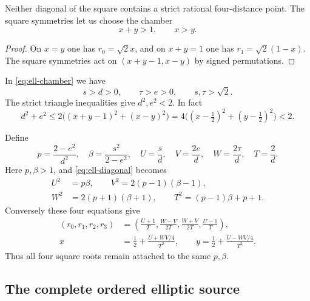 \begin{lemma}\label{lem:ell-diagonal-exclusion}
Neither diagonal of the square contains a strict rational four-distance
point.  The square symmetries let us choose the chamber
\begin{equation}\label{eq:ell-chamber}
 x+y>1,\qquad x>y.
\end{equation}
\end{lemma}
\begin{proof}
On $x=y$
one has $r_0=\sqrt2x$, and on $x+y=1$ one has
$r_1=\sqrt2(1-x)$.  The square symmetries act on
$(x+y-1,x-y)$ by signed permutations.
\end{proof}
In \eqref{eq:ell-chamber} we have
\[
 s>d>0,\qquad \tau>e>0,\qquad s,\tau>\sqrt2.
\]
The strict triangle inequalities give $d^2,e^2<2$.  In fact
\begin{equation}\label{eq:ell-J-negative}
 d^2+e^2\leq
 2\bigl((x+y-1)^2+(x-y)^2\bigr)
 =4\bigl((x-\tfrac12)^2+(y-\tfrac12)^2\bigr)<2.
\end{equation}

Define
\begin{equation}\label{eq:ell-pure-coordinates}
 p=\frac{2-e^2}{d^2},\quad
 \beta=\frac{s^2}{2-e^2},\quad
 U=\frac{s}{d},\quad V=\frac{2e}{d},\quad
 W=\frac{2\tau}{d},\quad T=\frac2d.
\end{equation}
Here $p,\beta>1$, and \eqref{eq:ell-diagonal} becomes
\begin{equation}\label{eq:ell-pure}
 \begin{aligned}
 U^2&=p\beta,\qquad
 V^2=2(p-1)(\beta-1),\\
 W^2&=2(p+1)(\beta+1),\qquad
 T^2=(p-1)\beta+p+1.
 \end{aligned}
\end{equation}
Conversely these four equations give
\begin{equation}\label{eq:ell-pure-return}
 \begin{aligned}
 (r_0,r_1,r_2,r_3)
 &=\left(\frac{U+1}{T},\frac{W-V}{2T},
          \frac{W+V}{2T},\frac{U-1}{T}\right),\\
 x&=\frac12+\frac{U+WV/4}{T^2},\qquad
 y=\frac12+\frac{U-WV/4}{T^2}.
 \end{aligned}
\end{equation}
Thus all four square roots remain attached to the same $p,\beta$.

\subsection{The complete ordered elliptic source}

